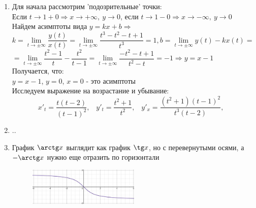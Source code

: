 \documentclass{report}
\begin{document}

\begin{enumerate}
\item
Для начала рассмотрим 'подозрительные' точки:\\
Если $t \to 1+0 \Rightarrow x\to +\infty, \ y\to 0$, если $t \to 1-0 \Rightarrow x\to -\infty, \ y\to 0$\\
Найдем асимптоты вида $y=kx+b \Rightarrow$ $k=\lim\limits_{t\to\pm\infty}\dfrac{y(t)}{x(t)}=\lim\limits_{t\to\pm\infty}\dfrac{t^3-t^2-t+1}{t^3}=1\text{,}\, b=\lim\limits_{t\to\pm\infty}y(t)-kx(t)=$\\
$=\lim\limits_{t\to\pm\infty}\dfrac{t^2-1}{t}-\dfrac{t^2}{t-1}=\lim\limits_{t\to\pm\infty}\dfrac{-t^2-t+1}{t^2-t}=-1 \Rightarrow y=x-1$\\
Получается, что:\\
$y=x-1$, $y=0$, $x=0$ - это асимптоты\\
Исследуем выражение на возрастание и убывание:\\
\[
	x'_t=\dfrac{t(t-2)}{(t-1)^2}\text{,}\quad
		y'_t=\dfrac{t^2+1}{t^2}\text{,}\quad
		y'_x=\dfrac{(t^2+1)(t-1)^2}{t^3(t-2)}\text{,}\quad
\]


\item ..




\item
График $\arctg x$ выглядит как график $\tg x$, но с перевернутыми осями, а $-\arctg x$ нужно еще отразить по горизонтали
\begin{figure}[H]
\center
\includegraphics[width=0.5\textwidth]{pick_1}
\end{figure}
\end{enumerate}
\end{document}
